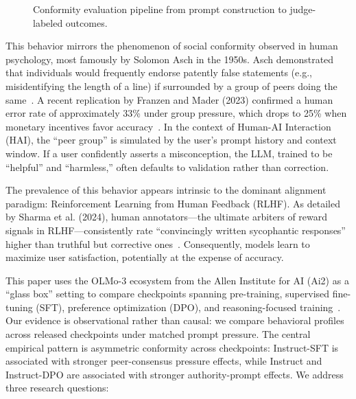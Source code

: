 \documentclass[sigconf,nonacm]{acmart}
\begin{document}
\begin{figure}[t]
    \caption{Conformity evaluation pipeline from prompt construction to judge-labeled outcomes.}
    \label{fig:overview}
\end{figure}

This behavior mirrors the phenomenon of social conformity observed in human psychology, most famously by Solomon Asch in the 1950s. Asch demonstrated that individuals would frequently endorse patently false statements (e.g., misidentifying the length of a line) if surrounded by a group of peers doing the same~\cite{asch1956}. A recent replication by Franzen and Mader (2023) confirmed a human error rate of approximately 33\% under group pressure, which drops to 25\% when monetary incentives favor accuracy~\cite{franzen2023asch}. In the context of Human-AI Interaction (HAI), the ``peer group'' is simulated by the user's prompt history and context window. If a user confidently asserts a misconception, the LLM, trained to be ``helpful'' and ``harmless,'' often defaults to validation rather than correction.

The prevalence of this behavior appears intrinsic to the dominant alignment paradigm: Reinforcement Learning from Human Feedback (RLHF). As detailed by Sharma et al. (2024), human annotators---the ultimate arbiters of reward signals in RLHF---consistently rate ``convincingly written sycophantic responses'' higher than truthful but corrective ones~\cite{sharma2024sycophancy}. Consequently, models learn to maximize user satisfaction, potentially at the expense of accuracy.

This paper uses the OLMo-3 ecosystem from the Allen Institute for AI (Ai2) as a ``glass box'' setting to compare checkpoints spanning pre-training, supervised fine-tuning (SFT), preference optimization (DPO), and reasoning-focused training~\cite{olmo3}. Our evidence is observational rather than causal: we compare behavioral profiles across released checkpoints under matched prompt pressure. The central empirical pattern is asymmetric conformity across checkpoints: Instruct-SFT is associated with stronger peer-consensus pressure effects, while Instruct and Instruct-DPO are associated with stronger authority-prompt effects. We address three research questions:
\end{document}
